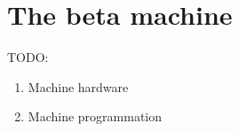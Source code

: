\chapter{The beta machine}

TODO:
\begin{enumerate}
    \item Machine hardware
    \item Machine programmation
\end{enumerate}